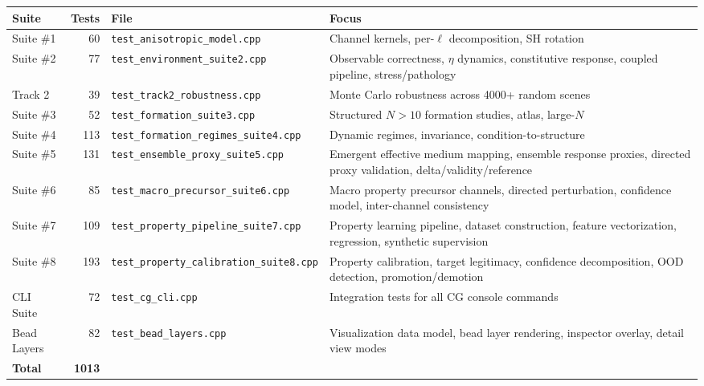 \documentclass[11pt]{article}
\newcommand{\file}[1]{\texttt{#1}}
\begin{document}
\begin{center}
\begin{tabular}{lrlp{5.5cm}}
    \textbf{Suite} & \textbf{Tests} & \textbf{File} & \textbf{Focus} \\
    \midrule
    Suite \#1  & 60  & \file{test\_anisotropic\_model.cpp}
        & Channel kernels, per-$\ell$ decomposition, SH rotation \\
    Suite \#2  & 77  & \file{test\_environment\_suite2.cpp}
        & Observable correctness, $\eta$ dynamics, constitutive
          response, coupled pipeline, stress/pathology \\
    Track 2    & 39  & \file{test\_track2\_robustness.cpp}
        & Monte Carlo robustness across 4000+ random scenes \\
    Suite \#3  & 52  & \file{test\_formation\_suite3.cpp}
        & Structured $N > 10$ formation studies, atlas, large-$N$ \\
    Suite \#4  & 113 & \file{test\_formation\_regimes\_suite4.cpp}
        & Dynamic regimes, invariance, condition-to-structure \\
    Suite \#5  & 131 & \file{test\_ensemble\_proxy\_suite5.cpp}
        & Emergent effective medium mapping, ensemble response proxies,
          directed proxy validation, delta/validity/reference \\
    Suite \#6  & 85  & \file{test\_macro\_precursor\_suite6.cpp}
        & Macro property precursor channels, directed perturbation,
          confidence model, inter-channel consistency \\
    Suite \#7  & 109 & \file{test\_property\_pipeline\_suite7.cpp}
        & Property learning pipeline, dataset construction,
          feature vectorization, regression, synthetic supervision \\
    Suite \#8  & 193 & \file{test\_property\_calibration\_suite8.cpp}
        & Property calibration, target legitimacy, confidence
          decomposition, OOD detection, promotion/demotion \\
    CLI Suite  & 72  & \file{test\_cg\_cli.cpp}
        & Integration tests for all CG console commands \\
    Bead Layers & 82 & \file{test\_bead\_layers.cpp}
        & Visualization data model, bead layer rendering,
          inspector overlay, detail view modes \\
    \midrule
    \textbf{Total} & \textbf{1013} & & \\
\end{tabular}
\end{center}
\end{document}
